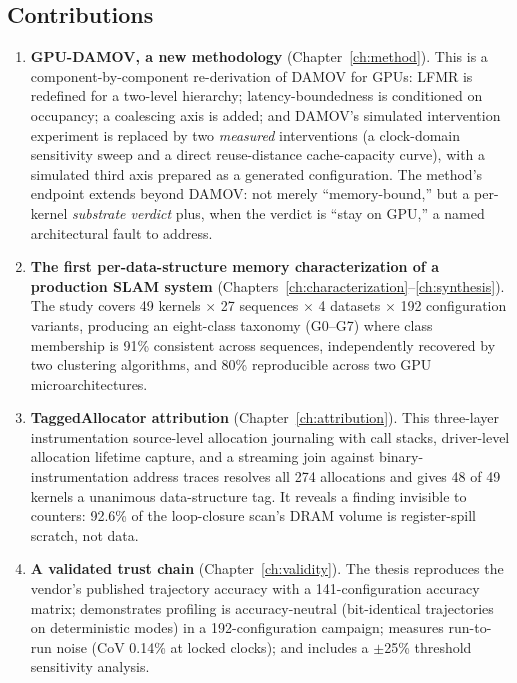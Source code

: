 \subsection{Contributions}
\begin{enumerate}

\item \textbf{GPU-DAMOV, a new methodology} (Chapter~\ref{ch:method}). This is a component-by-component re-derivation of DAMOV for GPUs: LFMR is redefined for a two-level hierarchy; latency-boundedness is conditioned on occupancy; a coalescing axis is added; and DAMOV's simulated intervention experiment is replaced by two \emph{measured} interventions (a clock-domain sensitivity sweep and a direct reuse-distance cache-capacity curve), with a simulated third axis prepared as a generated configuration. The method’s endpoint extends beyond DAMOV: not merely ``memory-bound,'' but a per-kernel \emph{substrate verdict} plus, when the verdict is ``stay on GPU,'' a named architectural fault to address.

\item \textbf{The first per-data-structure memory characterization of a production SLAM system} (Chapters~\ref{ch:characterization}--\ref{ch:synthesis}). The study covers 49 kernels $\times$ 27 sequences $\times$ 4 datasets $\times$ 192 configuration variants, producing an eight-class taxonomy (G0--G7) where class membership is 91\% consistent across sequences, independently recovered by two clustering algorithms, and 80\% reproducible across two GPU microarchitectures.    

\item \textbf{TaggedAllocator attribution} (Chapter~\ref{ch:attribution}). This three-layer instrumentation source-level allocation journaling with call stacks, driver-level allocation lifetime capture, and a streaming join against binary-instrumentation address traces resolves all 274 allocations and gives 48 of 49 kernels a unanimous data-structure tag. It reveals a finding invisible to counters: 92.6\% of the loop-closure scan's DRAM volume is register-spill scratch, not data.   

\item \textbf{A validated trust chain} (Chapter~\ref{ch:validity}). The thesis reproduces the vendor's published trajectory accuracy with a 141-configuration accuracy matrix; demonstrates profiling is accuracy-neutral (bit-identical trajectories on deterministic modes) in a 192-configuration campaign; measures run-to-run noise (CoV 0.14\% at locked clocks); and includes a $\pm$25\% threshold sensitivity analysis.


\end{enumerate}
